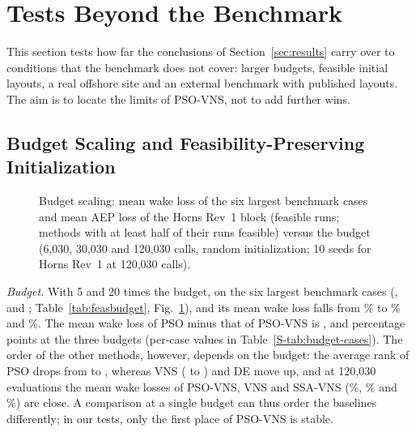 \section{Tests Beyond the Benchmark}
\label{sec:beyond}
This section tests how far the conclusions of Section~\ref{sec:results} carry over to conditions that the benchmark does not cover: larger budgets, feasible initial layouts, a real offshore site and an external benchmark with published layouts. The aim is to locate the limits of PSO-VNS, not to add further wins.

\subsection{Budget Scaling and Feasibility-Preserving Initialization}
\label{sec:feasinit}
\label{sec:budget}

\begin{figure}[!t]
\centering
{}
\caption{Budget scaling: mean wake loss of the six largest benchmark cases and mean AEP loss of the Horns Rev~1 block (feasible runs; methods with at least half of their runs feasible) versus the budget (6,030, 30,030 and 120,030 calls, random initialization; 10 seeds for Horns Rev~1 at 120,030 calls).}
\label{fig:budget}
\end{figure}

\emph{Budget.} With 5 and 20 times the budget, \NBudgetPhrase{} on the six largest benchmark cases (\NBudRankPSOVNSSixK, \NBudRankPSOVNSThirtyK{} and \NBudRankPSOVNSOneTwentyK; Table~\ref{tab:feasbudget}, Fig.~\ref{fig:budget}), and its mean wake loss falls from \NBudLossPSOVNSSixK\% to \NBudLossPSOVNSThirtyK\% and \NBudLossPSOVNSOneTwentyK\%. The mean wake loss of PSO minus that of PSO-VNS is \NBudGainPSOSixK, \NBudGainPSOThirtyK{} and \NBudGainPSOOneTwentyK{} percentage points at the three budgets (per-case values in Table~\ref{S-tab:budget-cases}). The order of the other methods, however, depends on the budget: the average rank of PSO drops from \NBudRankPSOSixK{} to \NBudRankPSOOneTwentyK, whereas VNS (\NBudRankVNSSixK{} to \NBudRankVNSOneTwentyK) and DE move up, and at 120,030 evaluations the mean wake losses of PSO-VNS, VNS and SSA-VNS (\NBudLossPSOVNSOneTwentyK\%, \NBudLossVNSOneTwentyK\% and \NBudLossSSAVNSOneTwentyK\%) are close. A comparison at a single budget can thus order the baselines differently; in our tests, only the first place of PSO-VNS is stable.

